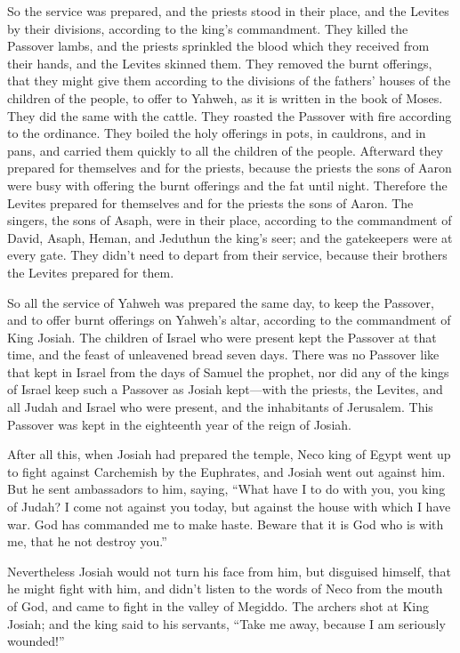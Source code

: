  So the service was prepared, and the priests stood in
their place, and the Levites by their divisions, according to the king's
commandment.  They killed the Passover lambs, and the
priests sprinkled the blood which they received from their hands, and
the Levites skinned them.  They removed the burnt
offerings, that they might give them according to the divisions of the
fathers' houses of the children of the people, to offer to Yahweh, as it
is written in the book of Moses. They did the same with the cattle.
 They roasted the Passover with fire according to the
ordinance. They boiled the holy offerings in pots, in cauldrons, and in
pans, and carried them quickly to all the children of the people.
 Afterward they prepared for themselves and for the
priests, because the priests the sons of Aaron were busy with offering
the burnt offerings and the fat until night. Therefore the Levites
prepared for themselves and for the priests the sons of Aaron.
 The singers, the sons of Asaph, were in their place,
according to the commandment of David, Asaph, Heman, and Jeduthun the
king's seer; and the gatekeepers were at every gate. They didn't need to
depart from their service, because their brothers the Levites prepared
for them.

 So all the service of Yahweh was prepared the same day,
to keep the Passover, and to offer burnt offerings on Yahweh's altar,
according to the commandment of King Josiah.  The
children of Israel who were present kept the Passover at that time, and
the feast of unleavened bread seven days.  There was no
Passover like that kept in Israel from the days of Samuel the prophet,
nor did any of the kings of Israel keep such a Passover as Josiah
kept---with the priests, the Levites, and all Judah and Israel who were
present, and the inhabitants of Jerusalem.  This Passover
was kept in the eighteenth year of the reign of Josiah.

 After all this, when Josiah had prepared the temple,
Neco king of Egypt went up to fight against Carchemish by the Euphrates,
and Josiah went out against him.  But he sent ambassadors
to him, saying, ``What have I to do with you, you king of Judah? I come
not against you today, but against the house with which I have war. God
has commanded me to make haste. Beware that it is God who is with me,
that he not destroy you.''

 Nevertheless Josiah would not turn his face from him,
but disguised himself, that he might fight with him, and didn't listen
to the words of Neco from the mouth of God, and came to fight in the
valley of Megiddo.  The archers shot at King Josiah; and
the king said to his servants, ``Take me away, because I am seriously
wounded!''

